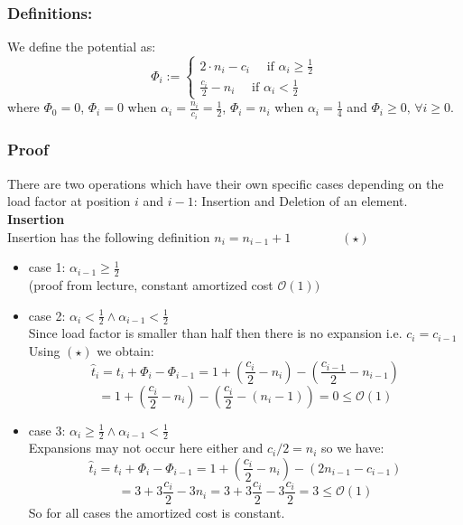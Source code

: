 \documentclass[10pt,a4paper]{article}
\begin{document}
\subsubsection*{Definitions:}

We define the potential as:
$$
\Phi_i := \begin{cases}
2 \cdot n_i - c_i    \quad\text{ if }  \alpha_i \geq \frac{1}{2}\\
\frac{c_i}{2} - n_i  \quad  \text{ if } \alpha_i < \frac{1}{2}
\end{cases}
$$
where $\Phi_0 = 0$, $\Phi_i = 0$ when $\alpha_i = \frac{n_i}{c_i}= \frac{1}{2}$, $\Phi_i = n_i$ when $\alpha_i = \frac{1}{4}$ and $\Phi_i \geq 0 ,\, \forall i \geq 0$.\\

\subsubsection*{Proof}
There are two operations which have their own specific cases depending on the load factor at position $i$ and $i-1$: Insertion and Deletion of an element.\\


\textbf{Insertion}\\
Insertion has the following definition $n_i = n_{i-1} + 1 \quad \quad \quad \quad (\star)$
\begin{itemize}
\item case 1: $\alpha_{i-1} \geq \frac{1}{2}$ \\
(proof from lecture, constant amortized cost $\mathcal{O}(1))$
\item case 2: $\alpha_{i} < \frac{1}{2} \land \alpha_{i-1} < \frac{1}{2} $\\
Since load factor is smaller than half then there is no expansion i.e. $c_i = c_{i-1}$ Using $(\star)$ we obtain:
$$
\hat{t}_i = t_i + \Phi_i -\Phi_{i-1}
= 1 + (\frac{c_i}{2} - n_i) - (\frac{c_{i-1}}{2} - n_{i-1})
$$
$$
=1 + (\frac{c_i}{2} - n_i) - (\frac{c_{i}}{2} - (n_{i} - 1)) = 0 \leq \mathcal{O}(1)
$$

\item case 3: $\alpha_i \geq \frac{1}{2} \land \alpha_{i-1} < \frac{1}{2}$\\
Expansions may not occur here either and $c_i / 2 = n_i$ so we have:
$$
\hat{t}_i = t_i + \Phi_i -\Phi_{i-1}
= 1 + (\frac{c_i}{2} - n_i) - (2n_{i-1} - c_{i-1})
$$
$$
= 3 + 3\frac{c_i}{2} - 3n_i = 3 + 3\frac{c_i}{2} - 3\frac{c_i}{2}
= 3 \leq \mathcal{O}(1)
$$
So for all cases the amortized cost is constant.
\end{itemize}
\end{document}
